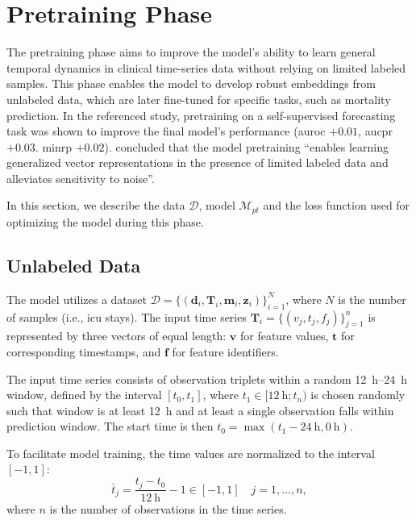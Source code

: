 \section{Pretraining Phase}
\label{sec:pretraining}

The pretraining phase aims to improve the model's ability to learn general temporal dynamics in clinical time-series data without relying on limited labeled samples. This phase enables the model to develop robust embeddings from unlabeled data, which are later fine-tuned for specific tasks, such as mortality prediction. In the referenced study, pretraining on a self-supervised forecasting task was shown to improve the final model's performance (\gls{auroc} \( +0.01 \), \gls{aucpr} \( +0.03 \). \gls{minrp} \( +0.02 \)).
\citeauthor{STraTS2022} concluded that the model pretraining ``enables learning generalized vector representations in the presence of limited labeled data and alleviates sensitivity to noise''.

In this section, we describe the data \( \mathcal{D} \), model \( \mathcal{M}_{pt} \) and the loss function used for optimizing the model during this phase.


\subsection{Unlabeled Data}

The model utilizes a dataset \( \mathcal{D} = \{(\mathbf{d}_i, \mathbf{T}_i, \mathbf{m}_i, \mathbf{z}_i)\}_{i=1}^{N} \), where \( N \) is the number of samples (i.e., \gls{icu} stays). The input time series \( \mathbf{T}_i = \{(v_j, t_j, f_j)\}_{j=1}^{n} \) is represented by three vectors of equal length: \( \mathbf{v} \) for feature values, \( \mathbf{t} \) for corresponding timestamps, and \( \mathbf{f} \) for feature identifiers.

The input time series consists of observation triplets within a random \qtyrange{12}{24}{\hour}  window, defined by the interval \([t_0, t_1]\), where \( t_1 \in [\qty{12}{\hour}; t_n ) \) is chosen randomly such that window is at least \qty{12}{\hour} and at least a single observation falls within prediction window. The start time is then \( t_0 = \max(t_1 - \qty{24}{\hour}, \qty{0}{\hour}) \).

To facilitate model training, the time values are normalized to the interval \([-1, 1]\):
\begin{equation}
    \label{eq:normalize_time}
    \bar{t}_j = \frac{t_j - t_0}{\qty{12}{\hour}} - 1 \in [-1, 1] \quad j = 1, \dots, n,
\end{equation}
where \( n \) is the number of observations in the time series.

